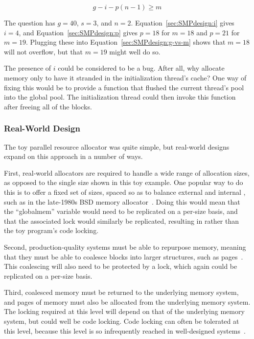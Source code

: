 {{	\begin{equation}
		g - i - p(n - 1) \ge m
	\label{sec:SMPdesign:g-vs-m}
	\end{equation}

	The question has $g=40$, $s=3$, and $n=2$.
	Equation~\ref{sec:SMPdesign:i} gives $i=4$, and
	Equation~\ref{sec:SMPdesign:p} gives $p=18$ for $m=18$
	and $p=21$ for $m=19$.
	Plugging these into Equation~\ref{sec:SMPdesign:g-vs-m}
	shows that $m=18$ will not overflow, but that $m=19$ might
	well do so.

	The presence of $i$ could be considered to be a bug.
	After all, why allocate memory only to have it stranded in
	the initialization thread's cache?
	One way of fixing this would be to provide a 
	function that flushed the current thread's pool into the
	global pool.
	The initialization thread could then invoke this function
	after freeing all of the blocks.
}\QuickQuizEndE
}

\subsubsection{Real-World Design}

The toy parallel resource allocator was quite simple, but real-world
designs expand on this approach in a number of ways.

First, real-world allocators are required to handle a wide range
of allocation sizes, as opposed to the single size shown in this
toy example.
One popular way to do this is to offer a fixed set of sizes, spaced
so as to balance external and internal , such as in
the late-1980s BSD memory allocator~\cite{McKusick88}.
Doing this would mean that the ``globalmem'' variable would need
to be replicated on a per-size basis, and that the associated
lock would similarly be replicated, resulting in 
rather than the toy program's code locking.

Second, production-quality systems must be able to repurpose memory,
meaning that they must be able to coalesce blocks into larger structures,
such as pages~\cite{McKenney93}.
This coalescing will also need to be protected by a lock, which again
could be replicated on a per-size basis.

Third, coalesced memory must be returned to the underlying memory
system, and pages of memory must also be allocated from the underlying
memory system.
The locking required at this level will depend on that of the underlying
memory system, but could well be code locking.
Code locking can often be tolerated at this level, because this
level is so infrequently reached in well-designed systems~\cite{McKenney01e}.

